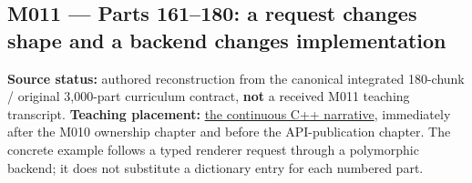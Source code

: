 \subsection{M011 --- Parts 161--180: a request changes shape and a backend changes implementation}\label{appendix-fd090d982a15-m011-parts-161180-a-request-changes-shape-and-a-backend-changes-implementation}

\textbf{Source status:} authored reconstruction from the canonical integrated 180-chunk / original 3,000-part curriculum contract, \textbf{not} a received M011 teaching transcript. \textbf{Teaching placement:} \hyperref[01-foundations-i-ch004-from-one-owned-resource-to-many-requests-and-a-replaceable-backend]{the continuous C++ narrative}, immediately after the M010 ownership chapter and before the API-publication chapter. The concrete example follows a typed renderer request through a polymorphic backend; it does not substitute a dictionary entry for each numbered part.

